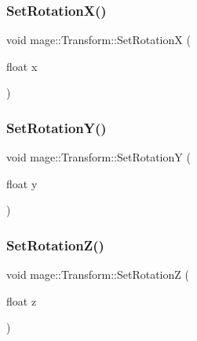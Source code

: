 \hypertarget{structmage_1_1_transform_ae526dabb395eea9481fc072624f6bec4}{}\label{structmage_1_1_transform_ae526dabb395eea9481fc072624f6bec4} 
\subsubsection{\texorpdfstring{Set\+Rotation\+X()}{SetRotationX()}}
{\footnotesize\ttfamily void mage\+::\+Transform\+::\+Set\+RotationX (\begin{DoxyParamCaption}\item[{float}]{x }\end{DoxyParamCaption})}

\hypertarget{structmage_1_1_transform_a95c83ba282bf84aeb1c49d9ba8242609}{}\label{structmage_1_1_transform_a95c83ba282bf84aeb1c49d9ba8242609} 
\subsubsection{\texorpdfstring{Set\+Rotation\+Y()}{SetRotationY()}}
{\footnotesize\ttfamily void mage\+::\+Transform\+::\+Set\+RotationY (\begin{DoxyParamCaption}\item[{float}]{y }\end{DoxyParamCaption})}

\hypertarget{structmage_1_1_transform_ac587047697f24d2279e7b4f5ab333f44}{}\label{structmage_1_1_transform_ac587047697f24d2279e7b4f5ab333f44} 
\subsubsection{\texorpdfstring{Set\+Rotation\+Z()}{SetRotationZ()}}
{\footnotesize\ttfamily void mage\+::\+Transform\+::\+Set\+RotationZ (\begin{DoxyParamCaption}\item[{float}]{z }\end{DoxyParamCaption})}

\hypertarget{structmage_1_1_transform_a6c7e193f6bfddb8c7af5c35b538cdee5}{}\label{structmage_1_1_transform_a6c7e193f6bfddb8c7af5c35b538cdee5} 
